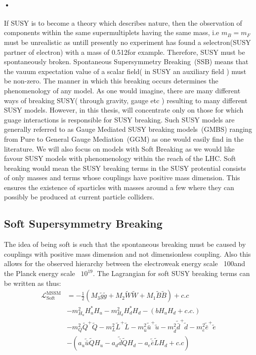 \paragraph*{•}
If SUSY is to become a theory which describes nature, then the observation of components within the same supermultiplets having the same mass, i.e $m_{B}=m_{F}$ must be unrealistic as untill presently no experiment has found a selectron(SUSY partner of electron) with a mass of 0.512\MeV for example. Therefore, SUSY must be spontaneously broken. Spontaneous Supersymmetry Breaking~(SSB) means that the vauum expectation value of a scalar field( in SUSY an auxiliary field ) must be non-zero. The manner in which this breaking occurs determines the phenomenology of any model. As one would imagine, there are many different ways of breaking SUSY( through gravity, gauge etc ) resulting to many different SUSY models. However, in this thesis, will concentrate only on those for which  guage interactions is responsible for SUSY breaking. Such SUSY models are generally referred to as Gauge Mediated SUSY breaking models~(GMBS) ranging from Pure to General Gauge Mediation~(GGM) as one would easily find in the literature.
We will also focus on models with Soft Breaking as we would like favour SUSY models with phenomenology within the reach of the LHC. Soft breaking would mean the SUSY breaking terms in the SUSY protential consists of only masses and terms whose couplings have positive mass dimension. This ensures the existence of sparticles with masses around a few \TeV where they can possibly be produced at current particle colliders.
\subsection{Soft Supersymmetry Breaking}
The idea of being soft is such that the spontaneous breaking must be caused by couplings with positive mass dimension and not dimensionless coupling. Also this allows for the observed hierarchy between the electroweak energy scale ~100\GeV and the Planck energy scale ~$10^{19}$\GeV .
The Lagrangian for soft SUSY breaking terms  can be written as thus:
\begin{align}
\mathcal{L}^{\mbox{MSSM}}_{\mbox{Soft}} &= -\frac{1}{2}\left( M_{3}\tilde{g}\tilde{g} + M_{2}\tilde{W}\tilde{W} + M_{1}\tilde{B}\tilde{B}\right) + c.c \\
&- m^{2}_{H_{u}}H^{*}_{u}H_{u} - m^{2}_{H_{d}}H^{*}_{d}H_{d} - \left( bH_{u}H_{d} + c.c. \right) \\
&- m^{2}_{Q}\tilde{Q}^{+}\tilde{Q} - m^{2}_{L}\tilde{L}^{+}\tilde{L} - m^{2}_{\bar{u}}\tilde{\bar{u}}^{+}\tilde{u}-m^{2}_{\bar{d}}\tilde{\bar{d}}^{+}\tilde{d} -m^{2}_{\bar{e}}\tilde{\bar{e}}^{+}\tilde{e}\\
& -\left(a_{u}\tilde{\bar{u}}\tilde{Q}H_{u} - a_{d}\tilde{\bar{d}}\tilde{Q}H_{d} - a_{e}\tilde{\bar{e}}\tilde{L}H_{d} + c.c \right)
\end{align}


